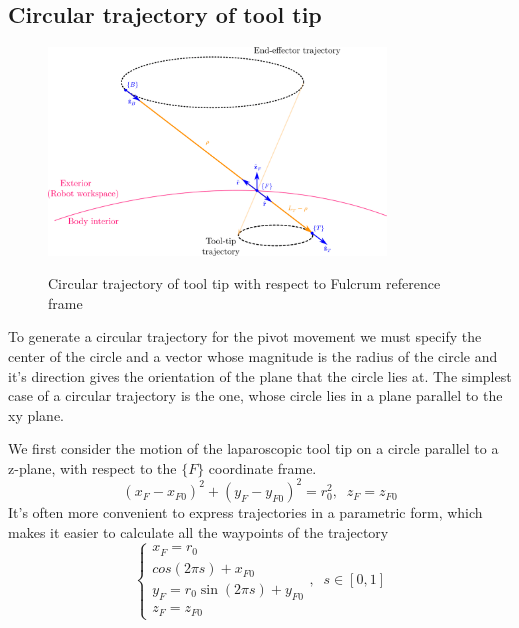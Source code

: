 \subsection{Circular trajectory of tool tip}

\begin{center}
\begin{figure}[!htb]
\centering
\includegraphics[width=0.8\textwidth]{images/circular-trajectory-wrt-fulcrum.png}\\
\caption{Circular trajectory of tool tip with respect to Fulcrum reference frame}
\end{figure}
\end{center}

To generate a circular trajectory for the pivot movement we must specify the center of the circle 
and a vector whose magnitude is the radius of the circle and it’s direction gives the orientation 
of the plane that the circle lies at. The simplest case of a circular trajectory is the one, 
whose circle lies in a plane parallel to the xy plane.


We first consider the motion of the laparoscopic tool tip on a circle parallel to a z-plane, with respect to the $\lbrace F \rbrace$ coordinate frame.
\begin{equation}
(x^{}_{F} - x^{}_{F0})^2 + (y^{}_{F} - y^{}_{F0})^2 = r_0^2, \;\; z^{}_{F} = z^{}_{F0}
\end{equation}
It's often more convenient to express trajectories in a parametric form, which makes it easier to calculate all the waypoints of the trajectory
\begin{equation}
\label{circle-z-plane-traj}
\begin{cases}
x^{}_{F} = r_0\\cos(2πs) + x^{}_{F0} \\
y^{}_{F} = r_0\sin(2πs) + y^{}_{F0} \\
z^{}_{F} = z^{}_{F0}
\end{cases} ,
\;\;
s \in [0, 1]
\end{equation}

